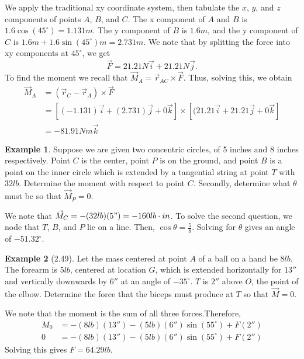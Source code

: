 \documentclass[11pt]{article}
\theoremstyle{plain} %
\theoremstyle{definition}
\theoremstyle{example}
\newtheorem*{example}{Example}
\theoremstyle{remark}
\begin{document}
We apply the traditional xy coordinate system, then tabulate the $x$, $y$, and $z$ components of points $A$, $B$, and $C$. The x component of $A$ and $B$ is $1.6\cos\left(45^{\circ}\right) = 1.131m$. The y component of $B$ is $1.6m$, and the y component of $C$ is $1.6m+1.6\sin\left(45^{\circ}\right)m = 2.731m$. We note that by splitting the force into xy components at $45^{\circ}$, we get $$\vec{F} = 21.21N\vec{i} + 21.21N\vec{j}.$$
To find the moment we recall that $\vec{M}_A =\vec{r}_{AC}\times\vec{F}$. Thus, solving this, we obtain
\begin{align*}
\vec{M}_A &= \left(\vec{r}_C-\vec{r}_A\right)\times\vec{F} \\
&= \left[(-1.131)\vec{i} + (2.731)\vec{j} + 0 \vec{k}\right] \times \left[(21.21\vec{i} + 21.21\vec{j}+0\vec{k}\right]\\
&= -81.91Nm\vec{k}
\end{align*}

\begin{example}
Suppose we are given two concentric circles, of 5 inches and 8 inches respectively. Point $C$ is the center, point $P$ is on the ground, and point $B$ is a point on the inner circle which is extended by a tangential string at point $T$ with $32 lb$. Determine the moment with respect to point $C$. Secondly, determine what $\theta$ must be so that $\vec{M}_P = 0$. 
\end{example}

We note that $\vec{M}_C = -(32lb)(5") = -160lb\cdot in$. To solve the second question, we node that $T$, $B$, and $P$ lie on a line. Then, $\cos\theta = \frac{5}{8}$. Solving for $\theta$ gives an angle of $-51.32^{\circ}$. 

\begin{example}[2.49]
Let the mass centered at point $A$ of a ball on a hand be $8lb$. The forearm is $5lb$, centered at location $G$, which is extended horizontally for $13''$ and vertically downwards by $6''$ at an angle of $-35^{\circ}$. $T$ is $2''$ above $O$, the point of the elbow. Determine the force that the biceps must produce at $T$ so that $\vec{M} = 0$. 
\end{example}

We note that the moment is the sum of all three forces.Therefore, 
\begin{align*}
	M_0 &= -(8lb)(13'')-(5lb)(6'')\sin(55^{\circ})+F(2'') \\
	0 &= -(8lb)(13'')-(5lb)(6'')\sin(55^{\circ})+F(2'')
\end{align*}
Solving this gives $F = 64.29lb$. 
\end{document}
